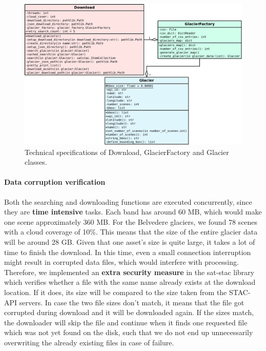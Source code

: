 \documentclass[11pt, a4paper]{report}
\begin{document}
	\begin{figure}[h]
		\centering
		\includegraphics[scale=0.23]{../images/sd_diagram.png}
		\caption{Technical specifications of Download, GlacierFactory and Glacier classes.}
		\label{fig:sd_diagram}
	\end{figure}
	\paragraph{Data corruption verification}
	Both the searching and downloading functions are executed concurrently, since they are \textbf{time intensive} tasks. Each band has around 60 MB, which would make one scene approximately 360 MB. For the Belvedere glaciers, we found 78 scenes with a cloud coverage of 10\%. This means that the size of the entire glacier data will be around 28 GB. Given that one asset's size is quite large, it takes a lot of time to finish the download. In this time, even a small connection interruption might result in corrupted data files, which would interfere with processing. Therefore, we implemented an \textbf{extra security measure} in the sat-stac library which verifies whether a file with the same name already exists at the download location. If it does, its size will be compared to the size taken from the STAC-API servers. In case the two file sizes don't match, it means that the file got corrupted during download and it will be downloaded again. If the sizes match, the downloader will skip the file and continue when it finds one requested file which was not yet found on the disk, such that we do not end up unnecessarily overwriting the already existing files in case of failure.
	
\end{document}
